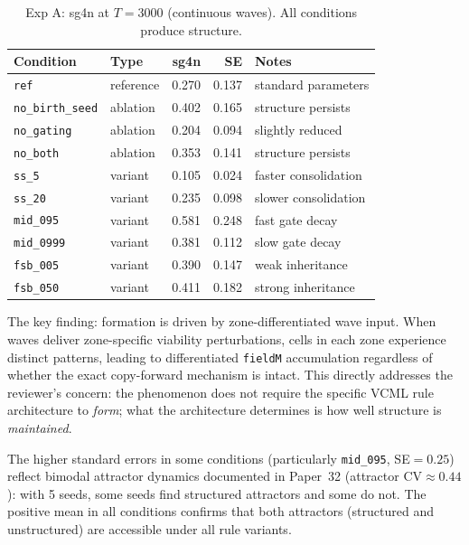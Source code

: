 \documentclass[11pt,a4paper]{article}
\begin{document}
\begin{table}[h]
\centering
\caption{Exp A: sg4n at $T{=}3000$ (continuous waves). All conditions produce structure.}
\label{tab:expa}
\begin{tabular}{llrrl}
\toprule
\textbf{Condition} & \textbf{Type} & \textbf{sg4n} & \textbf{SE} & \textbf{Notes}\\
\midrule
\texttt{ref}           & reference & 0.270 & 0.137 & standard parameters\\
\texttt{no\_birth\_seed} & ablation & 0.402 & 0.165 & structure persists\\
\texttt{no\_gating}    & ablation  & 0.204 & 0.094 & slightly reduced\\
\texttt{no\_both}      & ablation  & 0.353 & 0.141 & structure persists\\
\midrule
\texttt{ss\_5}         & variant   & 0.105 & 0.024 & faster consolidation\\
\texttt{ss\_20}        & variant   & 0.235 & 0.098 & slower consolidation\\
\texttt{mid\_095}      & variant   & 0.581 & 0.248 & fast gate decay\\
\texttt{mid\_0999}     & variant   & 0.381 & 0.112 & slow gate decay\\
\texttt{fsb\_005}      & variant   & 0.390 & 0.147 & weak inheritance\\
\texttt{fsb\_050}      & variant   & 0.411 & 0.182 & strong inheritance\\
\bottomrule
\end{tabular}
\end{table}

The key finding: formation is driven by zone-differentiated wave input.  When waves
deliver zone-specific viability perturbations, cells in each zone experience distinct
patterns, leading to differentiated \texttt{fieldM} accumulation regardless of whether
the exact copy-forward mechanism is intact.  This directly addresses the reviewer's
concern: the phenomenon does not require the specific VCML rule architecture to
\emph{form}; what the architecture determines is how well structure is \emph{maintained}.

The higher standard errors in some conditions (particularly \texttt{mid\_095}, SE$=0.25$)
reflect bimodal attractor dynamics documented in Paper~32 (attractor CV$\approx 0.44$):
with 5 seeds, some seeds find structured attractors and some do not.  The positive mean
in all conditions confirms that both attractors (structured and unstructured) are
accessible under all rule variants.
\end{document}
